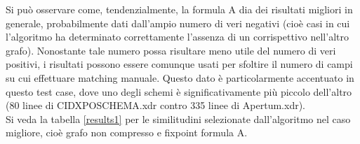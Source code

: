 \documentclass[a4paper,10pt]{article}
\begin{document}
Si può osservare come, tendenzialmente, la formula A dia dei risultati migliori in generale, probabilmente dati dall'ampio numero di veri negativi (cioè casi in cui l'algoritmo ha determinato correttamente l'assenza di un corrispettivo nell'altro grafo). Nonostante tale numero possa risultare meno utile del numero di veri positivi, i risultati possono essere comunque usati per sfoltire il numero di campi su cui effettuare matching manuale. Questo dato è particolarmente accentuato in questo test case, dove uno degli schemi è significativamente più piccolo dell'altro (80 linee di CIDXPOSCHEMA.xdr contro 335 linee di Apertum.xdr).\\

Si veda la tabella \ref{results1} per le similitudini selezionate dall’algoritmo nel caso migliore, cioè grafo non compresso e fixpoint formula A.
\end{document}

